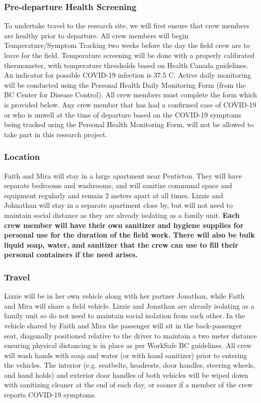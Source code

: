 \documentclass[11pt,letter]{article}
\begin{document}
\subsubsection {Pre-departure Health Screening}
To undertake travel to the research site, we will first ensure that crew members are healthy prior to departure. All crew members will begin Temperature/Symptom Tracking two weeks before the day the field crew are to leave for the field. Temperature screening will be done with a properly calibrated thermometer, with temperature thresholds based on Health Canada guidelines. An indicator for possible COVID-19 infection is 37.5 C. Active daily monitoring will be conducted using the Personal Health Daily Monitoring Form (from the BC Center for Disease Control). All crew members must complete the form which is provided below. Any crew member that has had a confirmed case of COVID-19 or who is unwell at the time of departure based on the COVID-19 symptoms being tracked using the Personal Health Monitoring Form, will not be allowed to take part in this research project.
   
\subsubsection{Location}
Faith and Mira will stay in a large apartment near Penticton. They will have separate bedrooms and washrooms, and will sanitize communal space and equipment regularly and remain 2 meters apart at all times. Lizzie and Johnathan will stay in a separate apartment close by, but will not need to maintain social distance as they are already isolating as a family unit. \textbf{Each crew member will have their own sanitizer and hygiene supplies for personal use for the duration of the field work. There will also be bulk liquid soap, water, and sanitizer that the crew can use to fill their personal containers if the need arises.}

\subsubsection {Travel}
Lizzie will be in her own vehicle along with her partner Jonathan, while Faith and Mira will share a field vehicle. Lizzie and Jonathan are already isolating as a family unit so do not need to maintain social isolation from each other. In the vehicle shared by Faith and Mira the passenger will sit in the back-passenger seat, diagonally positioned relative to the driver to maintain a two meter distance ensuring physical distancing is in place as per WorkSafe BC guidelines. All crew will wash hands with soap and water (or with hand sanitizer) prior to entering the vehicles. The interior (e.g. seatbelts, headrests, door handles, steering wheels, and hand holds) and exterior door handles of both vehicles will be wiped down with sanitizing cleaner at the end of each day, or sooner if a member of the crew reports COVID-19 symptoms.
\end{document}
